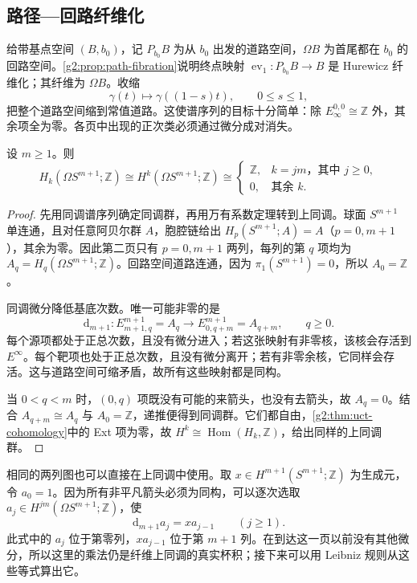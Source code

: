 \subsection{路径—回路纤维化}
\label{g2:subsec:1103:03}
给带基点空间 \((B,b_0)\)，记 \(P_{b_0}B\) 为从 \(b_0\) 出发的道路空间，\(\Omega B\) 为首尾都在 \(b_0\) 的回路空间。\cref{g2:prop:path-fibration}说明终点映射 \(\operatorname{ev}_1:P_{b_0}B\to B\) 是 Hurewicz 纤维化；其纤维为 \(\Omega B\)。收缩
\[
	\gamma(t)\longmapsto\gamma((1-s)t),\qquad 0\le s\le1,
\]
把整个道路空间缩到常值道路。这使谱序列的目标十分简单：除 \(E_\infty^{0,0}\cong\mathbb Z\) 外，其余项全为零。各页中出现的正次类必须通过微分成对消失。

\begin{proposition}\label{g2:prop:loop-sphere-additive}
	设 \(m\ge1\)。则
	\[
		H_k(\Omega S^{m+1};\mathbb Z)\cong H^k(\Omega S^{m+1};\mathbb Z)\cong
		\begin{cases}
			\mathbb Z,&k=jm\text{，其中 }j\ge0,\\
			0,&\text{其余 }k.
		\end{cases}
	\]
\end{proposition}
\begin{proof}
	先用同调谱序列确定同调群，再用万有系数定理转到上同调。球面 \(S^{m+1}\) 单连通，且对任意阿贝尔群 \(A\)，胞腔链给出 \(H_p(S^{m+1};A)=A\)（\(p=0,m+1\)），其余为零。因此第二页只有 \(p=0,m+1\) 两列，每列的第 \(q\) 项均为 \(A_q=H_q(\Omega S^{m+1};\mathbb Z)\)。回路空间道路连通，因为 \(\pi_1(S^{m+1})=0\)，所以 \(A_0=\mathbb Z\)。

	同调微分降低基底次数。唯一可能非零的是
	\[
		\mathrm d_{m+1}:E^{m+1}_{m+1,q}=A_q\longrightarrow E^{m+1}_{0,q+m}=A_{q+m},\qquad q\ge0.
	\]
	每个源项都处于正总次数，且没有微分进入；若这张映射有非零核，该核会存活到 \(E^\infty\)。每个靶项也处于正总次数，且没有微分离开；若有非零余核，它同样会存活。这与道路空间可缩矛盾，故所有这些映射都是同构。

	当 \(0<q<m\) 时，\((0,q)\) 项既没有可能的来箭头，也没有去箭头，故 \(A_q=0\)。结合 \(A_{q+m}\cong A_q\) 与 \(A_0=\mathbb Z\)，递推便得到同调群。它们都自由，\cref{g2:thm:uct-cohomology}中的 Ext 项为零，故 \(H^k\cong\operatorname{Hom}(H_k,\mathbb Z)\)，给出同样的上同调群。
\end{proof}

相同的两列图也可以直接在上同调中使用。取 \(x\in H^{m+1}(S^{m+1};\mathbb Z)\) 为生成元，令 \(a_0=1\)。因为所有非平凡箭头必须为同构，可以逐次选取 \(a_j\in H^{jm}(\Omega S^{m+1};\mathbb Z)\)，使
\begin{equation}\label{g2:eq:loop-sphere-normalized-differential}
	\mathrm d_{m+1}a_j=x a_{j-1}\qquad(j\ge1).
\end{equation}
此式中的 \(a_j\) 位于第零列，\(xa_{j-1}\) 位于第 \(m+1\) 列。在到达这一页以前没有其他微分，所以这里的乘法仍是纤维上同调的真实杯积；接下来可以用 Leibniz 规则从这些等式算出它。

